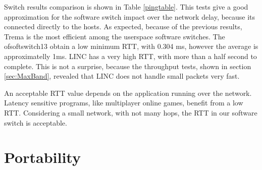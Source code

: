     Switch results comparison is shown in Table \ref{pingtable}. This tests give a good approximation for the software switch impact over the network delay, because its connected directly to the hosts. As expected, because of the previous results, Trema is the most efficient among the userspace software switches. The ofsoftswitch13 obtain a low minimum RTT, with 0.304 ms, however the average is approximatelly 1ms. LINC has a very high RTT, with more than a half second to complete. This is not a surprise, because the throughput tests, shown in section \ref{sec:MaxBand}, revealed that LINC does not handle small packets very fast.   
    
    An acceptable RTT value depends on the application running over the network. Latency sensitive programs, like multiplayer online games, benefit from a low RTT. Considering a small network, with not many hops, the RTT in our software switch is acceptable.   

    \begin{table}[H]
    \caption{Ping Round Trip Time comparison between software switches}
    \label{pingtable}
    \end{table}

\section{Portability}

